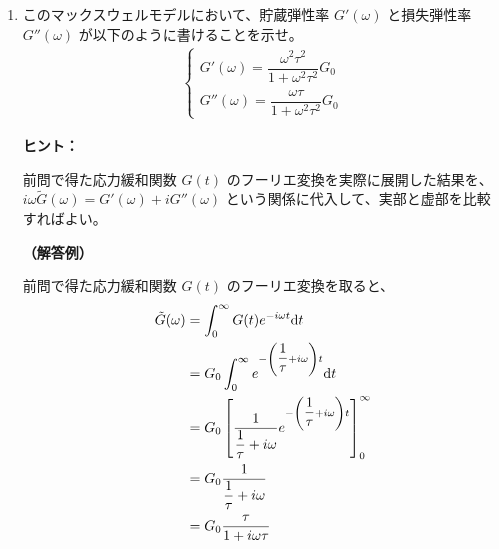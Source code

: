 \documentclass[uplatex,dvipdfmx,a4paper,11pt]{jsarticle}
\newcommand{\diff}{\mathrm d}
\begin{document}
\begin{enumerate}
%



\color{black}

\newpage

\item
このマックスウェルモデルにおいて、貯蔵弾性率 $G'(\omega)$ と損失弾性率 $G''(\omega)$ が以下のように書けることを示せ。
\begin{align*}
\begin{cases}
G' (\omega) = \dfrac{\omega^2 \tau^2}{1+\omega^2 \tau^2} G_0 \\[8pt]
G'' (\omega) = \dfrac{\omega \tau}{1+\omega^2 \tau^2} G_0
\end{cases}
\end{align*}


\begin{itembox}[l]{{\bf ヒント：}}

前問で得た応力緩和関数 $G(t)$ のフーリエ変換を実際に展開した結果を、$i\omega \tilde{G} (\omega) = G'(\omega) + i G''(\omega)$ という関係に代入して、実部と虚部を比較すればよい。

\end{itembox}


{\bf （解答例）}



前問で得た応力緩和関数 $G(t)$ のフーリエ変換を取ると、
\begin{align*}
\tilde{G}(\omega) 
	&= \int_0^{\infty} G(t) e^{-i\omega t } \diff t \notag \\
	&= G_0 \int_0^{\infty} e^{-\left(\dfrac{1}{\tau} + i\omega \right)t} \diff t \notag \\
	&= G_0 \left[ \dfrac{1}{\dfrac{1}{\tau} + i\omega} e^{ -\left(\dfrac{1}{\tau} + i\omega \right)t} \right]_0^{\infty} \notag \\
	&= G_0 \dfrac{1}{\dfrac{1}{\tau} + i\omega} \\
	&= G_0 \dfrac{\tau}{1 + i \omega \tau}
\end{align*}


\end{enumerate}
\end{document}
